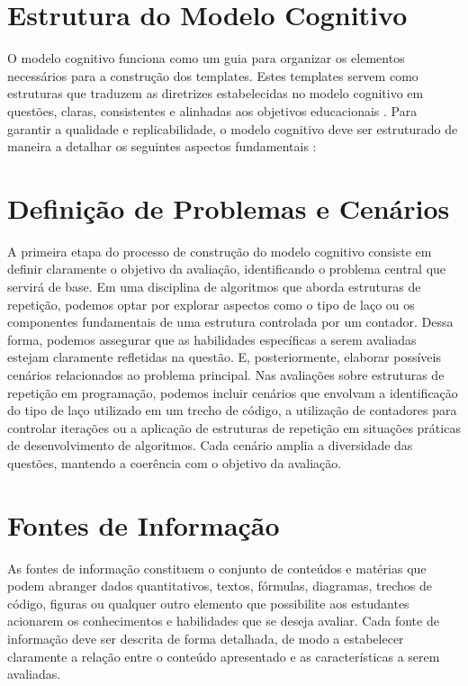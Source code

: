 \section{Estrutura do Modelo Cognitivo}

O modelo cognitivo funciona como um guia para organizar os elementos necessários para a construção dos templates. Estes templates servem como estruturas que traduzem as diretrizes estabelecidas no modelo cognitivo em questões, claras, consistentes e alinhadas aos objetivos educacionais \parencite{keehner2017, gierl2017}. Para garantir a qualidade e replicabilidade, o modelo cognitivo deve ser estruturado de maneira a detalhar os seguintes aspectos fundamentais : 

\section{Definição de Problemas e Cenários}

A primeira etapa do processo de construção do modelo cognitivo consiste em definir claramente o objetivo da avaliação, identificando o problema central que servirá de base. Em uma disciplina de algoritmos que aborda estruturas de repetição, podemos optar por explorar aspectos como o tipo de laço ou os componentes fundamentais de uma estrutura controlada por um contador. Dessa forma, podemos assegurar que as habilidades específicas a serem avaliadas estejam claramente refletidas na questão. E, posteriormente, elaborar possíveis cenários relacionados ao problema principal. Nas avaliações sobre estruturas de repetição em programação, podemos incluir cenários que envolvam a identificação do tipo de laço utilizado em um trecho de código, a utilização de contadores para controlar iterações ou a aplicação de estruturas de repetição em situações práticas de desenvolvimento de algoritmos. Cada cenário amplia a diversidade das questões, mantendo a coerência com o objetivo da avaliação.

\section{Fontes de Informação}

As fontes de informação constituem o conjunto de conteúdos e matérias que podem abranger dados quantitativos, textos, fórmulas, diagramas, trechos de código, figuras ou qualquer outro elemento que possibilite aos estudantes acionarem os conhecimentos e habilidades que se deseja avaliar. Cada fonte de informação deve ser descrita de forma detalhada, de modo a estabelecer claramente a relação entre o conteúdo apresentado e as características a serem avaliadas.


